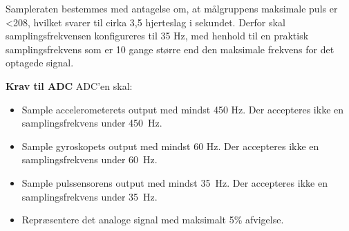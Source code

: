 Sampleraten bestemmes med antagelse om, at målgruppens maksimale puls er <208, hvilket svarer til cirka 3,5 hjerteslag i sekundet. Derfor skal samplingsfrekvensen konfigureres til 35 Hz, med henhold til en praktisk samplingsfrekvens som er 10 gange større end den maksimale frekvens for det optagede signal. 


\textbf{Krav til ADC} \newline
ADC'en skal:
\begin{itemize}
\item Sample accelerometerets output med mindst 450 Hz. Der accepteres ikke en samplingsfrekvens under 450~Hz.
\item Sample gyroskopets output med mindst 60 Hz. Der accepteres ikke en samplingsfrekvens under 60~Hz.
\item Sample pulssensorens output med mindst 35~Hz. Der accepteres ikke en samplingsfrekvens under 35~Hz. 
\item Repræsentere det analoge signal med maksimalt 5\% afvigelse. 
\end{itemize}
%

